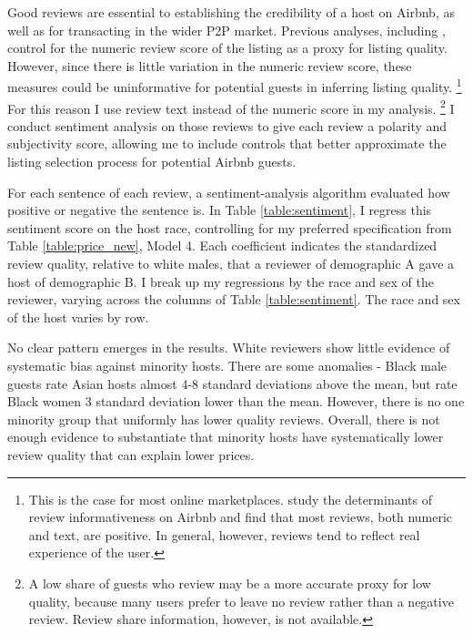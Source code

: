 Good reviews are essential to establishing the credibility of a host on Airbnb, as well as for transacting in the wider P2P market. Previous analyses, including \cite{edelman}, control for the numeric review score of the listing as a proxy for listing quality. However, since there is little variation in the numeric review score, these measures could be uninformative for potential guests in inferring listing quality.%
	\footnote{This is the case for most online marketplaces. \cite{fradkin} study the determinants of review informativeness on Airbnb and find that most reviews, both numeric and text, are positive. In general, however, reviews tend to reflect real experience of the user.} 
For this reason I use review text instead of the numeric score in my analysis.%
	\footnote{A low share of guests who review may be a more accurate proxy for low quality, because many users prefer to leave no review rather than a negative review. Review share information, however, is not available.} 
I conduct sentiment analysis on those reviews to give each review a polarity and subjectivity score, allowing me to include controls that better approximate the listing selection process for potential Airbnb guests.

For each sentence of each review, a sentiment-analysis algorithm evaluated how positive or negative the sentence is. In Table \ref{table:sentiment}, I regress this sentiment score on the host race, controlling for my preferred specification from Table \ref{table:price_new}, Model 4. Each coefficient indicates the standardized review quality, relative to white males, that a reviewer of demographic A gave a host of demographic B. I break up my regressions by the race and sex of the reviewer, varying across the columns of Table \ref{table:sentiment}. The race and sex of the host varies by row. 

No clear pattern emerges in the results. White reviewers show little evidence of systematic bias against minority hosts. There are some anomalies - Black male guests rate Asian hosts almost 4-8 standard deviations above the mean, but rate Black women 3 standard deviation lower than the mean. However, there is no one minority group that uniformly has lower quality reviews. Overall, there is not enough evidence to substantiate that minority hosts have systematically lower review quality that can explain lower prices. 













